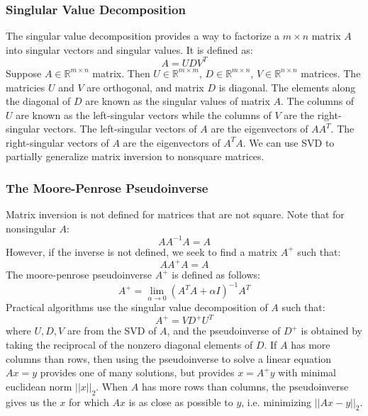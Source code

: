 \documentclass[twoside,twocolumn]{article}
\begin{document}
\subsubsection{Singlular Value Decomposition}
The singular value decomposition provides a way to factorize a $m \times n$
matrix $A$ into singular vectors and singular values. It is defined as:
\begin{equation}
  A = U D V^T
\end{equation}
Suppose $A \in \mathbb{R}^{m \times n}$ matrix. Then
$U \in \mathbb{R}^{m \times m}$, $D \in \mathbb{R}^{m \times n}$,
$ V \in \mathbb{R}^{n \times n}$ matrices. The matricies $U$ and $V$ are
orthogonal, and matrix $D$ is diagonal. The elements along the diagonal of $D$
are known as the singular values of matrix $A$. The columns of $U$ are known
as the left-singular vectors while the columns of $V$ are the right-singular
vectors. The left-singular vectors of $A$ are the eigenvectors of $AA^T$.
The right-singular vectors of $A$ are the eigenvectors of $A^TA$. We can use
SVD to partially generalize matrix inversion to nonsquare matrices.
\subsubsection{The Moore-Penrose Pseudoinverse}
Matrix inversion is not defined for matrices that are not square.
Note that for nonsingular $A$:
\begin{equation}
  A A^{-1}A = A
\end{equation}
However, if the inverse is not defined, we seek to find a matrix $A^{+}$ such
that:
\begin{equation}
  A A^{+}A = A
\end{equation}
The moore-penrose pseudoinverse $A^+$ is defined as follows:
\begin{equation}
  A^+ = \lim_{\alpha \to 0} (A^TA + \alpha I)^{-1}A^T
\end{equation}
Practical algorithms use the singular value decomposition of $A$ such that:
\begin{equation}
  A^+ = V D^+ U^T
\end{equation}
where $U, D, V$ are from the SVD of $A$, and the pseudoinverse of $D^+$ is
obtained by taking the reciprocal of the nonzero diagonal elements of $D$.
If $A$ has more columns than rows, then using the pseudoinverse to solve a
linear equation $Ax=y$ provides one of many solutions, but provides $x = A^+ y$
with minimal euclidean norm $||x||_2$. When $A$ has more rows than columns,
the pseudoinverse gives us the $x$ for which $Ax$ is as close as possible
to $y$, i.e. minimizing $||Ax-y||_2$.
\end{document}
